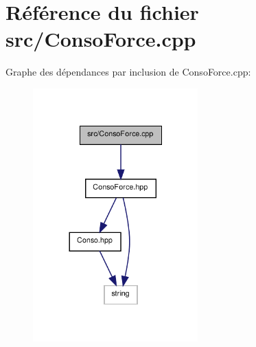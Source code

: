 \section{Référence du fichier src/\-Conso\-Force.cpp}
\label{_conso_force_8cpp}
Graphe des dépendances par inclusion de Conso\-Force.\-cpp\-:\nopagebreak
\begin{figure}[H]
\begin{center}
\leavevmode
\includegraphics[width=180pt]{_conso_force_8cpp__incl}
\end{center}
\end{figure}
